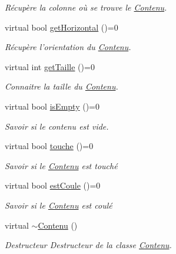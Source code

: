 \begin{DoxyCompactItemize}
\begin{DoxyCompactList}\small\item\em Récupère la colonne où se trouve le \hyperlink{classContenu}{Contenu}. \end{DoxyCompactList}\item 
virtual bool \hyperlink{classContenu_aa9b4dbb3de416310cd53422a0d14879b}{get\+Horizontal} ()=0
\begin{DoxyCompactList}\small\item\em Récupère l'orientation du \hyperlink{classContenu}{Contenu}. \end{DoxyCompactList}\item 
virtual int \hyperlink{classContenu_abba99a1726eb744067cca7deb571444b}{get\+Taille} ()=0
\begin{DoxyCompactList}\small\item\em Connaitre la taille du \hyperlink{classContenu}{Contenu}. \end{DoxyCompactList}\item 
virtual bool \hyperlink{classContenu_a426053a6e632f1963c1c59c1515c99fb}{is\+Empty} ()=0
\begin{DoxyCompactList}\small\item\em Savoir si le contenu est vide. \end{DoxyCompactList}\item 
virtual bool \hyperlink{classContenu_af917356550ccc6025373c652b6e8b938}{touche} ()=0
\begin{DoxyCompactList}\small\item\em Savoir si le \hyperlink{classContenu}{Contenu} est touché \end{DoxyCompactList}\item 
virtual bool \hyperlink{classContenu_ad8ba918a8d5a08e4f8c0c742778500d6}{est\+Coule} ()=0
\begin{DoxyCompactList}\small\item\em Savoir si le \hyperlink{classContenu}{Contenu} est coulé \end{DoxyCompactList}\item 
\hypertarget{classContenu_a77f59e494b5c0f00ceb2da8d0067d4b8}{virtual \hyperlink{classContenu_a77f59e494b5c0f00ceb2da8d0067d4b8}{$\sim$\+Contenu} ()}\label{classContenu_a77f59e494b5c0f00ceb2da8d0067d4b8}

\begin{DoxyCompactList}\small\item\em Destructeur Destructeur de la classe \hyperlink{classContenu}{Contenu}. \end{DoxyCompactList}\end{DoxyCompactItemize}
